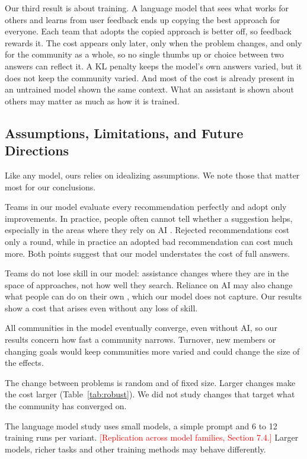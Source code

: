 \documentclass[11pt]{article}
\newcommand{\pending}[1]{\textcolor{red}{[#1]}}
\begin{document}
Our third result is about training. A language model that sees what works for others and learns from user feedback ends up copying the best approach for everyone. Each team that adopts the copied approach is better off, so feedback rewards it. The cost appears only later, only when the problem changes, and only for the community as a whole, so no single thumbs up or choice between two answers can reflect it. A KL penalty keeps the model's own answers varied, but it does not keep the community varied. And most of the cost is already present in an untrained model shown the same context. What an assistant is shown about others may matter as much as how it is trained.

\subsection{Assumptions, Limitations, and Future Directions}

Like any model, ours relies on idealizing assumptions. We note those that matter most for our conclusions.

Teams in our model evaluate every recommendation perfectly and adopt only improvements. In practice, people often cannot tell whether a suggestion helps, especially in the areas where they rely on AI \citep{fazelpour2026navigating}. Rejected recommendations cost only a round, while in practice an adopted bad recommendation can cost much more. Both points suggest that our model understates the cost of full answers.

Teams do not lose skill in our model: assistance changes where they are in the space of approaches, not how well they search. Reliance on AI may also change what people can do on their own \citep{bastani2025generative}, which our model does not capture. Our results show a cost that arises even without any loss of skill.

All communities in the model eventually converge, even without AI, so our results concern how fast a community narrows. Turnover, new members or changing goals would keep communities more varied and could change the size of the effects.

The change between problems is random and of fixed size. Larger changes make the cost larger (Table~\ref{tab:robust}). We did not study changes that target what the community has converged on.

The language model study uses small models, a simple prompt and 6 to 12 training runs per variant. \pending{Replication across model families, Section 7.4.} Larger models, richer tasks and other training methods may behave differently.
\end{document}

